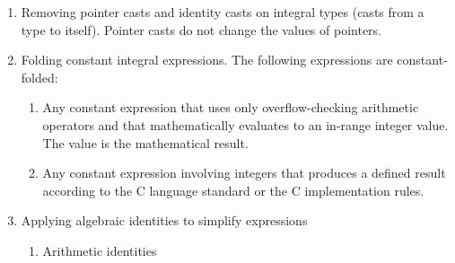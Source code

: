 \begin{enumerate}
\item
  Removing pointer casts and identity casts on integral types (casts
  from a type to itself). Pointer casts do not change the values of
  pointers.
\item
  Folding constant integral expressions. The following expressions are
  constant-folded:

  \begin{enumerate}
  \item
    Any constant expression that uses only overflow-checking arithmetic
    operators and that mathematically evaluates to an in-range integer
    value. The value is the mathematical result.
  \item
    Any constant expression involving integers that produces a defined
    result according to the C language standard or the C implementation
    rules.
  \end{enumerate}
\item
  Applying algebraic identities to simplify expressions

  \begin{enumerate}
  \item
    Arithmetic identities


\end{enumerate}
\end{enumerate}
